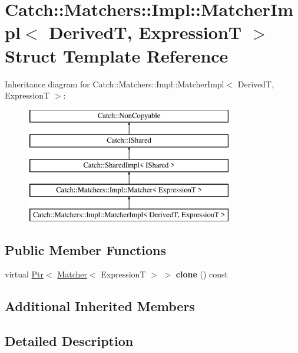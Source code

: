 \hypertarget{struct_catch_1_1_matchers_1_1_impl_1_1_matcher_impl}{}\section{Catch\+:\+:Matchers\+:\+:Impl\+:\+:Matcher\+Impl$<$ DerivedT, ExpressionT $>$ Struct Template Reference}
\label{struct_catch_1_1_matchers_1_1_impl_1_1_matcher_impl}
Inheritance diagram for Catch\+:\+:Matchers\+:\+:Impl\+:\+:Matcher\+Impl$<$ DerivedT, ExpressionT $>$\+:\begin{figure}[H]
\begin{center}
\leavevmode
\includegraphics[height=5.000000cm]{struct_catch_1_1_matchers_1_1_impl_1_1_matcher_impl}
\end{center}
\end{figure}
\subsection*{Public Member Functions}
\begin{DoxyCompactItemize}
\item 
\mbox{\label{struct_catch_1_1_matchers_1_1_impl_1_1_matcher_impl_af7cf4b7b730145d4455dc356490e6b77}} 
virtual \hyperlink{class_catch_1_1_ptr}{Ptr}$<$ \hyperlink{struct_catch_1_1_matchers_1_1_impl_1_1_matcher}{Matcher}$<$ ExpressionT $>$ $>$ {\bfseries clone} () const
\end{DoxyCompactItemize}
\subsection*{Additional Inherited Members}


\subsection{Detailed Description}
